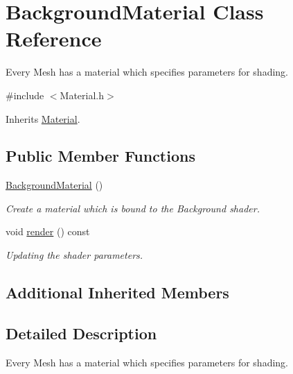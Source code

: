 \hypertarget{class_background_material}{\section{Background\-Material Class Reference}
\label{class_background_material}
}


Every Mesh has a material which specifies parameters for shading.  




{\ttfamily \#include $<$Material.\-h$>$}



Inherits \hyperlink{class_material}{Material}.

\subsection*{Public Member Functions}
\begin{DoxyCompactItemize}
\item 
\hypertarget{class_background_material_abaa02e3c678151591e896f4c1bca1700}{\hyperlink{class_background_material_abaa02e3c678151591e896f4c1bca1700}{Background\-Material} ()}\label{class_background_material_abaa02e3c678151591e896f4c1bca1700}

\begin{DoxyCompactList}\small\item\em Create a material which is bound to the Background shader. \end{DoxyCompactList}\item 
void \hyperlink{class_background_material_a1d6fbdf42dd015c61c38f1946bbb1a02}{render} () const 
\begin{DoxyCompactList}\small\item\em Updating the shader parameters. \end{DoxyCompactList}\end{DoxyCompactItemize}
\subsection*{Additional Inherited Members}


\subsection{Detailed Description}
Every Mesh has a material which specifies parameters for shading. 

